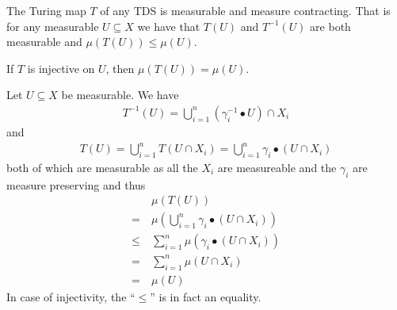 \begin{Lemma} \label{tds:lemma_tx_measurable:lemma}
	The Turing map $T$ of any TDS is measurable and measure contracting. That is for any measurable $U \subseteq X$ we have that $T(U)$ and $T^{-1}(U)$ are both measurable and $\mu(T(U)) \leq \mu(U)$.

	If $T$ is injective on $U$, then $\mu(T(U)) = \mu(U)$.
\end{Lemma}
\proof
Let $U \subseteq X$ be measurable. We have
\begin{align*}
	T^{-1}(U) = \bigcup_{i=1}^n (\gamma_i^{-1} \bullet U) \cap X_i
\end{align*}
and
\begin{align*}
	T(U) = \bigcup_{i=1}^n T(U \cap X_i) = \bigcup_{i=1}^n \gamma_i \bullet (U \cap X_i)
\end{align*}
both of which are measurable as all the $X_i$ are measureable and the $\gamma_i$ are measure preserving and thus
\begin{align*}
	  &\mu(T(U)) \\
	=~&\mu(\bigcup_{i=1}^n \gamma_i \bullet (U \cap X_i)) \\
	\leq~&\sum_{i=1}^n \mu(\gamma_i \bullet (U \cap X_i)) \\
	=~&\sum_{i=1}^n \mu(U \cap X_i) \\
	=~&\mu(U)
\end{align*}
In case of injectivity, the ``$\leq$'' is in fact an equality.
\endproof
